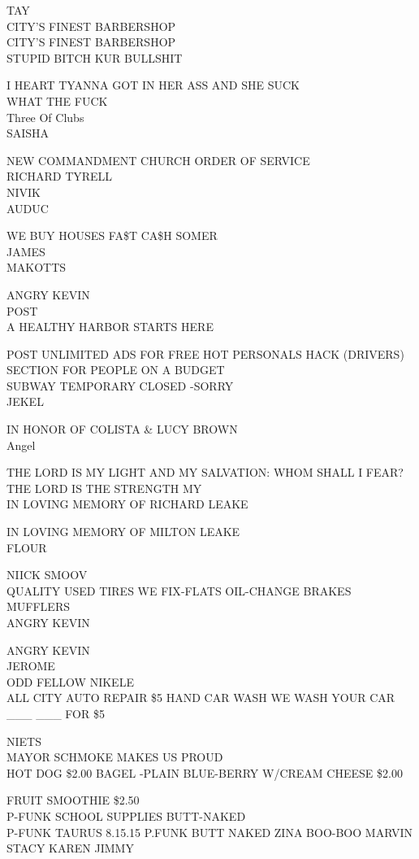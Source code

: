 \documentclass[10pt,letterpaper]{article}
\begin{document}
TAY\\
CITY'S FINEST BARBERSHOP\\
CITY'S FINEST BARBERSHOP\\
STUPID BITCH KUR BULLSHIT

I HEART TYANNA GOT IN HER ASS AND SHE SUCK\\
WHAT THE FUCK\\
Three Of Clubs\\
SAISHA

NEW COMMANDMENT CHURCH ORDER OF SERVICE\\
RICHARD TYRELL\\
NIVIK\\
AUDUC

WE BUY HOUSES FA\$T CA\$H SOMER\\
JAMES\\
MAKOTTS

ANGRY KEVIN\\
POST\\
A HEALTHY HARBOR STARTS HERE

POST UNLIMITED ADS FOR FREE HOT PERSONALS HACK (DRIVERS) SECTION FOR PEOPLE ON A BUDGET\\
SUBWAY TEMPORARY CLOSED {-}SORRY\\
JEKEL

IN HONOR OF COLISTA \& LUCY BROWN\\
Angel

THE LORD IS MY LIGHT AND MY SALVATION: WHOM SHALL I FEAR?  THE LORD IS THE STRENGTH MY\\
IN LOVING MEMORY OF RICHARD LEAKE

IN LOVING MEMORY OF MILTON LEAKE\\
FLOUR

NIICK SMOOV\\
QUALITY USED TIRES WE FIX{-}FLATS OIL{-}CHANGE BRAKES MUFFLERS\\
ANGRY KEVIN

ANGRY KEVIN\\
JEROME\\
ODD FELLOW NIKELE\\
ALL CITY AUTO REPAIR \$5 HAND CAR WASH WE WASH YOUR CAR \_\_\_ \_\_\_ FOR \$5

NIETS\\
MAYOR SCHMOKE MAKES US PROUD\\
HOT DOG \$2.00 BAGEL {-}PLAIN BLUE{-}BERRY W/CREAM CHEESE \$2.00

FRUIT SMOOTHIE \$2.50\\
P{-}FUNK SCHOOL SUPPLIES BUTT{-}NAKED\\
P{-}FUNK TAURUS 8.15.15 P.FUNK BUTT NAKED ZINA BOO{-}BOO MARVIN\\
STACY KAREN JIMMY
\end{document}
